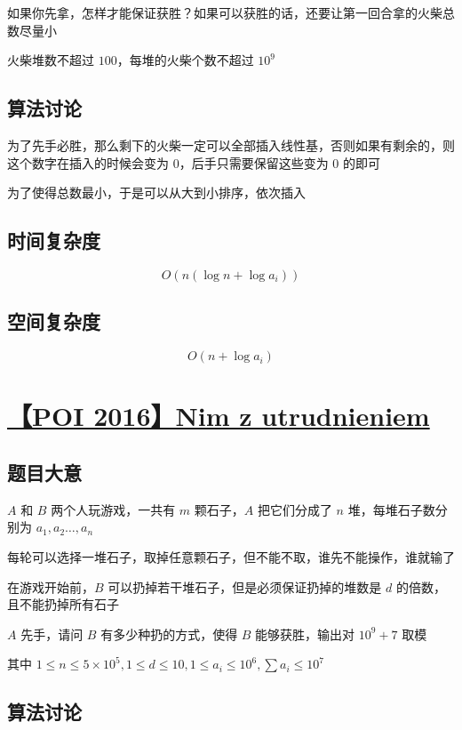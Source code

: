 \documentclass[UTF8]{article}
\begin{document}
如果你先拿，怎样才能保证获胜？如果可以获胜的话，还要让第一回合拿的火柴总数尽量小

火柴堆数不超过 $100$，每堆的火柴个数不超过 $10^9$

\subsection{算法讨论}

为了先手必胜，那么剩下的火柴一定可以全部插入线性基，否则如果有剩余的，则这个数字在插入的时候会变为 $0$，后手只需要保留这些变为 $0$ 的即可

为了使得总数最小，于是可以从大到小排序，依次插入

\subsection{时间复杂度}

$$
O(n (\log n + \log a_i))
$$

\subsection{空间复杂度}

$$
O(n+\log a_i)
$$

\section{\href{https://www.lydsy.com/JudgeOnline/problem.php?id=4347}{【POI 2016】Nim z utrudnieniem
}}

\subsection{题目大意}

$A$ 和 $B$ 两个人玩游戏，一共有 $m$ 颗石子，$A$ 把它们分成了 $n$ 堆，每堆石子数分别为 $a_1,a_2 \dots, a_n$

每轮可以选择一堆石子，取掉任意颗石子，但不能不取，谁先不能操作，谁就输了

在游戏开始前，$B$ 可以扔掉若干堆石子，但是必须保证扔掉的堆数是 $d$ 的倍数，且不能扔掉所有石子

$A$ 先手，请问 $B$ 有多少种扔的方式，使得 $B$ 能够获胜，输出对 $10^9+7$ 取模

其中 $1 \le n \le 5 \times 10^5, 1 \le d \le 10,1 \le a_i \le 10^6, \sum a_i \le 10^7$

\subsection{算法讨论}
\end{document}
